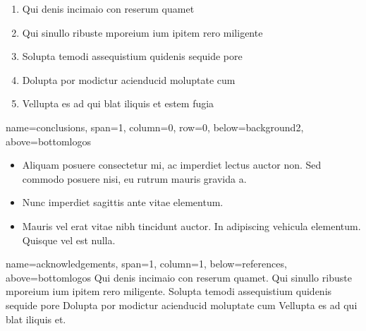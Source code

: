 \documentclass[a0paper,portrait]{baposter}
\newcommand{\acknowledgementsfont}{\fontsize{8.5pt}{10.5pt}\selectfont}
\begin{document}
\begin{poster}
{\begin{enumerate}
\item Qui denis incimaio con reserum quamet
\item Qui sinullo ribuste mporeium ium ipitem rero miligente
\item Solupta temodi assequistium quidenis sequide pore
\item Dolupta por modictur acienducid moluptate cum
\item Vellupta es ad qui blat iliquis et estem fugia
\end{enumerate}
\vspace{1mm}
}





{name=conclusions, span=1, column=0, row=0, below=background2, above=bottomlogos}{
\vspace{0.5mm}

\begin{itemize}
\item Aliquam posuere consectetur mi, ac imperdiet lectus auctor non.
Sed commodo posuere nisi, eu rutrum mauris gravida a.
\item Nunc imperdiet sagittis ante vitae elementum.
\item Mauris vel erat vitae nibh tincidunt auctor. In adipiscing vehicula
elementum. Quisque vel est nulla.
\end{itemize}
}

{name=acknowledgements, span=1, column=1, below=references, above=bottomlogos}{
\acknowledgementsfont
Qui denis incimaio con reserum quamet. Qui sinullo ribuste mporeium ium ipitem rero miligente. Solupta temodi assequistium quidenis sequide pore Dolupta por modictur acienducid moluptate cum Vellupta es ad qui blat iliquis et.
}

\end{poster}
\end{document}
